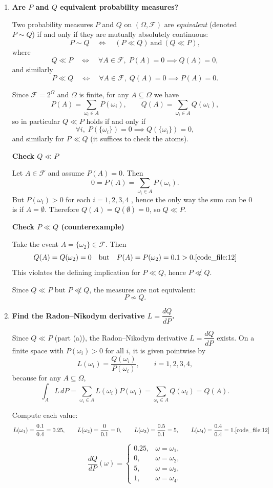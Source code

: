 \documentclass{article}
\begin{document}
\begin{enumerate}
\item[(a)] \textbf{Are $P$ and $Q$ equivalent probability measures?}

\medskip
Two probability measures $P$ and $Q$ on $(\Omega,\mathcal F)$ are \emph{equivalent} (denoted $P\sim Q$) if and only if they are mutually absolutely continuous:
\[
P\sim Q
\quad \Longleftrightarrow \quad
(P\ll Q)\ \text{and}\ (Q\ll P),
\]
where
\[
Q\ll P
\quad \Longleftrightarrow \quad
\forall A\in\mathcal F,\; P(A)=0 \implies Q(A)=0,
\]
and similarly
\[
P\ll Q
\quad \Longleftrightarrow \quad
\forall A\in\mathcal F,\; Q(A)=0 \implies P(A)=0.
\]

\medskip
Since $\mathcal F=2^\Omega$ and $\Omega$ is finite, for any $A\subseteq \Omega$ we have
\[
P(A)=\sum_{\omega_i\in A}P(\omega_i),
\qquad
Q(A)=\sum_{\omega_i\in A}Q(\omega_i),
\]
so in particular $Q\ll P$ holds if and only if
\[
\forall i,\; P(\{\omega_i\})=0 \implies Q(\{\omega_i\})=0,
\]
and similarly for $P\ll Q$ (it suffices to check the atoms).

\medskip
\noindent\textbf{Check $Q\ll P$}

Let $A\in\mathcal F$ and assume $P(A)=0$. Then
\[
0=P(A)=\sum_{\omega_i\in A}P(\omega_i).
\]
But $P(\omega_i)>0$ for each $i=1,2,3,4$ \cite{code_file:12}, hence the only way the sum can be $0$ is if $A=\emptyset$.
Therefore $Q(A)=Q(\emptyset)=0$, so $Q\ll P$.

\medskip
\noindent\textbf{Check $P\ll Q$ (counterexample)}

Take the event $A=\{\omega_2\}\in\mathcal F$. Then
\[
Q(A)=Q(\omega_2)=0
\quad\text{but}\quad
P(A)=P(\omega_2)=0.1>0. \cite{code_file:12}
\]
This violates the defining implication for $P\ll Q$, hence $P\not\ll Q$.

\medskip
\noindent Since $Q\ll P$ but $P\not\ll Q$, the measures are not equivalent:
\[
\boxed{\,P\not\sim Q.\,}
\]

\item[(b)] \textbf{Find the Radon--Nikodym derivative $L=\dfrac{dQ}{dP}$.}

\medskip
\noindent Since $Q\ll P$ (part (a)), the Radon--Nikodym derivative $L=\dfrac{dQ}{dP}$ exists.
On a finite space with $P(\omega_i)>0$ for all $i$, it is given pointwise by
\[
L(\omega_i)=\frac{Q(\omega_i)}{P(\omega_i)},\qquad i=1,2,3,4,
\]
because for any $A\subseteq\Omega$,
\[
\int_A L\,dP=\sum_{\omega_i\in A}L(\omega_i)P(\omega_i)=\sum_{\omega_i\in A}Q(\omega_i)=Q(A).
\]

Compute each value:
\[
L(\omega_1)=\frac{0.1}{0.4}=0.25,\qquad
L(\omega_2)=\frac{0}{0.1}=0,\qquad
L(\omega_3)=\frac{0.5}{0.1}=5,\qquad
L(\omega_4)=\frac{0.4}{0.4}=1. \cite{code_file:12}
\]


\[
\boxed{
\frac{dQ}{dP}(\omega)=
\begin{cases}
0.25, & \omega=\omega_1,\\
0, & \omega=\omega_2,\\
5, & \omega=\omega_3,\\
1, & \omega=\omega_4.
\end{cases}}
\]
\end{enumerate}
\newpage
\end{document}
